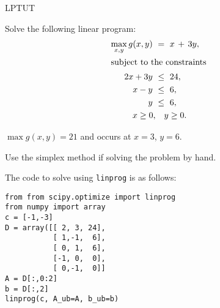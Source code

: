 
\begin{problems}{LPTUT}


	\begin{problem}
		Solve the following linear program:
		\begin{align*}
			\max_{x,y} 	g(x,y) \ &=\  x  \, + \,  3y, \\
		\intertext{subject to the constraints}
					2x 	+ 3y	\ &\leq \		24,	\\
					x	- y	\ &\leq \	 	6,	\\
					           y	\ &\leq \	 	6,	\\
					x \geq 0, 	& \quad  	y \geq 0.
		\end{align*}
		\begin{answer}$\max g(x,y) = 21$ and occurs at $x=3$, $y=6$.\end{answer}
		\begin{solution}
			Use the simplex method if solving the problem by hand.

			The code to solve using \texttt{linprog} is as follows:
\begin{verbatim}
from from scipy.optimize import linprog
from numpy import array
c = [-1,-3]
D = array([[ 2, 3, 24],
           [ 1,-1,  6],
           [ 0, 1,  6],
           [-1, 0,  0],
           [ 0,-1,  0]]
A = D[:,0:2]
b = D[:,2]
linprog(c, A_ub=A, b_ub=b)
\end{verbatim}
		\end{solution}
	\end{problem}



     
\end{problems}